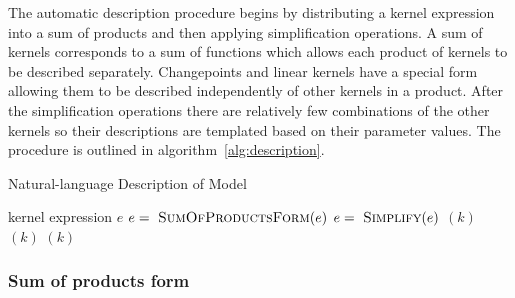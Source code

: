 \documentclass{article}
\begin{document}
The automatic description procedure begins by distributing a kernel expression into a sum of products and then applying simplification operations.
A sum of kernels corresponds to a sum of functions which allows each product of kernels to be described separately.
Changepoints and linear kernels have a special form allowing them to be described independently of other kernels in a product.
After the simplification operations there are relatively few combinations of the other kernels so their descriptions are templated based on their parameter values.
The procedure is outlined in algorithm~\ref{alg:description}.




\begin{algorithm}[tb]
   \caption{Natural-language Description of Model}
   \label{alg:description}
\begin{algorithmic}
    kernel expression $e$
   \STATE $e = {\textnormal{ \sc SumOfProductsForm}}(e)$
   \STATE $e = {\textnormal{ \sc Simplify}}(e)$
    $(k)$
    $(k)$
    $(k)$
   \ENDFOR
\end{algorithmic}
\end{algorithm}

\subsubsection{Sum of products form}
\end{document}
